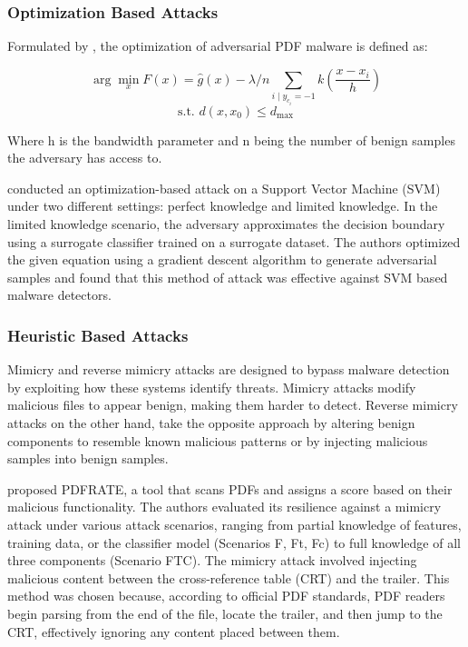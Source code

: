 \documentclass[10pt,twocolumn]{article}
\begin{document}
\subsubsection{Optimization Based Attacks}
Formulated by \textcite{Biggio2017}, the optimization of adversarial PDF malware is defined as: 

\[
\arg\min_{x} F(x) = \hat{g}(x) - 
\lambda /n \sum_{i \mid y_{c_i} = -1} 
k \left( \frac{x - x_i}{h} \right)
\]
\[
\text{s.t. } d(x, x_0) \leq d_{\max}
\]

Where h is the bandwidth parameter and n being the number of benign samples the adversary has access to. 


\textcite{Biggio2014} conducted an optimization-based attack on a Support Vector Machine (SVM) under two different settings: perfect knowledge and limited knowledge. In the limited knowledge scenario, the adversary approximates the decision boundary using a surrogate classifier trained on a surrogate dataset. The authors optimized the given equation using a gradient descent algorithm to generate adversarial samples and found that this method of attack was effective against SVM based malware detectors. 

\subsubsection{Heuristic Based Attacks}
Mimicry and reverse mimicry attacks are designed to bypass malware detection by exploiting how these systems identify threats. Mimicry attacks modify malicious files to appear benign, making them harder to detect. Reverse mimicry attacks on the other hand, take the opposite approach by altering benign components to resemble known malicious patterns or by injecting malicious samples into benign samples. 

\textcite{Srndic2014} proposed PDFRATE, a tool that scans PDFs and assigns a score based on their malicious functionality. The authors evaluated its resilience against a mimicry attack under various attack scenarios, ranging from partial knowledge of features, training data, or the classifier model (Scenarios F, Ft, Fc) to full knowledge of all three components (Scenario FTC). The mimicry attack involved injecting malicious content between the cross-reference table (CRT) and the trailer. This method was chosen because, according to official PDF standards, PDF readers begin parsing from the end of the file, locate the trailer, and then jump to the CRT, effectively ignoring any content placed between them.
\end{document}
